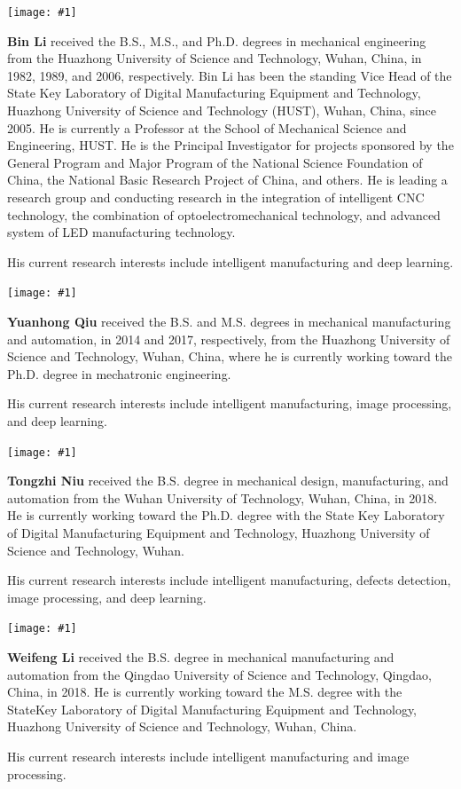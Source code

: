 \documentclass[sn-mathphys]{sn-jnl}%
\theoremstyle{thmstyleone}%
\theoremstyle{thmstyletwo}%
\theoremstyle{thmstylethree}%
\newcommand{\Biography}[3]{
\vspace{0.9cm}
\noindent\texttt{[image: \#1]}

\noindent\small #2}
\begin{document}
\Biography{bio-BinLi.jpeg}{\textbf{Bin Li} received the B.S., M.S., and Ph.D. degrees in mechanical engineering from the Huazhong University of Science and Technology, Wuhan, China, in 1982, 1989, and 2006, respectively. 
Bin Li has been the standing Vice Head of the State Key Laboratory of Digital Manufacturing Equipment and Technology, Huazhong University of Science and Technology (HUST), Wuhan, China, since 2005. He is currently a Professor at the School of Mechanical Science and Engineering, HUST. He is the Principal Investigator for projects sponsored by the General Program and Major Program of the National Science Foundation of China, the National Basic Research Project of China, and others. He is leading a research group and conducting research in the integration of intelligent CNC technology, the combination of optoelectromechanical technology, and advanced system of LED manufacturing technology. 

His current research interests include intelligent manufacturing and deep learning.}{width=3cm,height=3.8cm}


\Biography{bio-YuanhongQiu.png}{\textbf{Yuanhong Qiu} received the B.S. and M.S. degrees in mechanical manufacturing and automation, in 2014 and 2017, respectively, from the Huazhong University of Science and Technology, Wuhan, China, where he is currently working toward the Ph.D. degree in mechatronic engineering.

His current research interests include intelligent manufacturing, image processing, and deep learning.}{width=3cm,height=3.8cm}


\Biography{bio-TongzhiNiu.png}{\textbf{Tongzhi Niu} received the B.S. degree in mechanical design, manufacturing, and automation from the Wuhan University of Technology,
Wuhan, China, in 2018. He is currently working toward the Ph.D. degree with the State Key Laboratory of Digital Manufacturing Equipment and Technology, Huazhong University of Science and Technology, Wuhan.

His current research interests include intelligent manufacturing, defects detection, image processing, and deep learning.}{width=3cm,height=3.8cm}

\Biography{bio-WeifengLi.png}{\textbf{Weifeng Li} received the B.S. degree in mechanical manufacturing and automation from the Qingdao University of Science and Technology, Qingdao, China, in 2018. He is currently working toward the M.S. degree with the StateKey Laboratory of Digital Manufacturing Equipment and Technology, Huazhong University of Science and Technology, Wuhan, China.

His current research interests include intelligent manufacturing and image processing.}{width=3cm,height=3.8cm}
\end{document}

